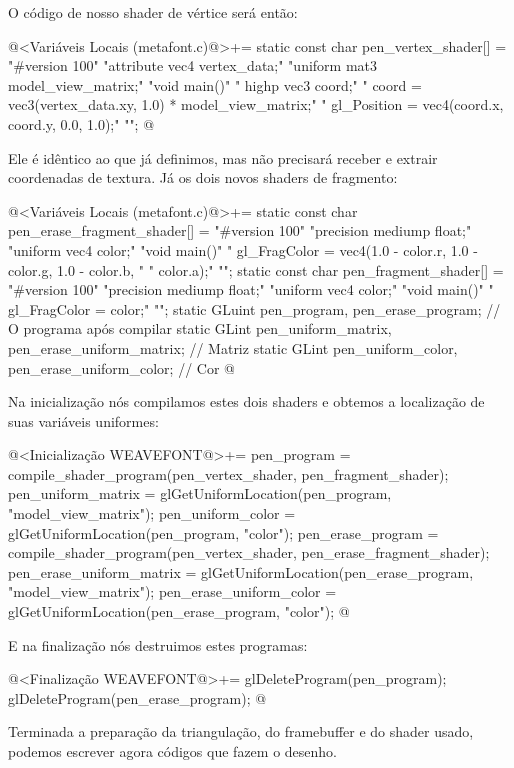 {{{{{{O código de nosso shader de vértice será então:

\iniciocodigo
@<Variáveis Locais (metafont.c)@>+=
static const char pen_vertex_shader[] =
  "#version 100\n"
  "attribute vec4 vertex_data;\n"
  "uniform mat3 model_view_matrix;\n"
  "void main(){\n"
  "  highp vec3 coord;\n"
  "  coord = vec3(vertex_data.xy, 1.0) * model_view_matrix;\n"
  "  gl_Position = vec4(coord.x, coord.y, 0.0, 1.0);\n"
  "}\n";
@
\fimcodigo

Ele é idêntico ao que já definimos, mas não precisará receber e
extrair coordenadas de textura. Já os dois novos shaders de fragmento:

\iniciocodigo
@<Variáveis Locais (metafont.c)@>+=
static const char pen_erase_fragment_shader[] =
  "#version 100\n"
  "precision mediump float;\n"
  "uniform vec4 color;\n"
  "void main(){\n"
  "  gl_FragColor = vec4(1.0 - color.r, 1.0 - color.g, 1.0 - color.b, \n"
  "                      color.a);\n"
  "}\n";
static const char pen_fragment_shader[] =
  "#version 100\n"
  "precision mediump float;\n"
  "uniform vec4 color;\n"
  "void main(){\n"
  "  gl_FragColor = color;"
  "}\n";
static GLuint pen_program, pen_erase_program; // O programa após compilar
static GLint pen_uniform_matrix, pen_erase_uniform_matrix; // Matriz
static GLint pen_uniform_color, pen_erase_uniform_color; // Cor
@
\fimcodigo

Na inicialização nós compilamos estes dois shaders e obtemos a
localização de suas variáveis uniformes:

\iniciocodigo
@<Inicialização WEAVEFONT@>+=
{
  pen_program = compile_shader_program(pen_vertex_shader, pen_fragment_shader);
  pen_uniform_matrix = glGetUniformLocation(pen_program, "model_view_matrix");
  pen_uniform_color = glGetUniformLocation(pen_program, "color");
  pen_erase_program = compile_shader_program(pen_vertex_shader,
                                            pen_erase_fragment_shader);
  pen_erase_uniform_matrix = glGetUniformLocation(pen_erase_program,
                                                  "model_view_matrix");
  pen_erase_uniform_color = glGetUniformLocation(pen_erase_program, "color");
}
@
\fimcodigo

E na finalização nós destruimos estes programas:

\iniciocodigo
@<Finalização WEAVEFONT@>+=
glDeleteProgram(pen_program);
glDeleteProgram(pen_erase_program);
@
\fimcodigo


Terminada a preparação da triangulação, do framebuffer e do shader
usado, podemos escrever agora códigos que fazem o desenho.

}}}}}}
